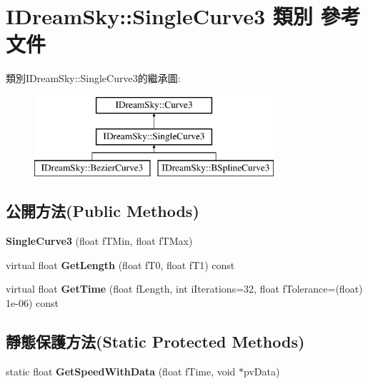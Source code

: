 \hypertarget{class_i_dream_sky_1_1_single_curve3}{}\section{I\+Dream\+Sky\+:\+:Single\+Curve3 類別 參考文件}
\label{class_i_dream_sky_1_1_single_curve3}
類別\+I\+Dream\+Sky\+:\+:Single\+Curve3的繼承圖\+:\begin{figure}[H]
\begin{center}
\leavevmode
\includegraphics[height=3.000000cm]{class_i_dream_sky_1_1_single_curve3}
\end{center}
\end{figure}
\subsection*{公開方法(Public Methods)}
\begin{DoxyCompactItemize}
\item 
{\bfseries Single\+Curve3} (float f\+T\+Min, float f\+T\+Max)\hypertarget{class_i_dream_sky_1_1_single_curve3_a9e5ddd59b506c7d7dba28c176ab9b59f}{}\label{class_i_dream_sky_1_1_single_curve3_a9e5ddd59b506c7d7dba28c176ab9b59f}

\item 
virtual float {\bfseries Get\+Length} (float f\+T0, float f\+T1) const \hypertarget{class_i_dream_sky_1_1_single_curve3_a827272d7e4b9a544538467f4fc82c76a}{}\label{class_i_dream_sky_1_1_single_curve3_a827272d7e4b9a544538467f4fc82c76a}

\item 
virtual float {\bfseries Get\+Time} (float f\+Length, int i\+Iterations=32, float f\+Tolerance=(float) 1e-\/06) const \hypertarget{class_i_dream_sky_1_1_single_curve3_a4464a156dfd15557c051831b2e84c33b}{}\label{class_i_dream_sky_1_1_single_curve3_a4464a156dfd15557c051831b2e84c33b}

\end{DoxyCompactItemize}
\subsection*{靜態保護方法(Static Protected Methods)}
\begin{DoxyCompactItemize}
\item 
static float {\bfseries Get\+Speed\+With\+Data} (float f\+Time, void $\ast$pv\+Data)\hypertarget{class_i_dream_sky_1_1_single_curve3_a99b6b098dd37823afc40c01e60416246}{}\label{class_i_dream_sky_1_1_single_curve3_a99b6b098dd37823afc40c01e60416246}

\end{DoxyCompactItemize}
